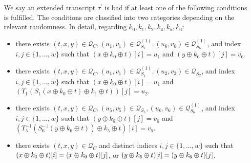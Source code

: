 \begin{definition}
	\label{defn:bad-tau-6-rounds}
	
	We say an extended transcript $\tau^{\prime}$ is bad if at least one of the following conditions is fulfilled. The conditions are classified into two categories depending on the relevant randomness. In detail, regarding $k_0,k_1,k_2,k_4,k_5,k_6$:
	\begin{itemize}[leftmargin=10mm]
		\item[\cone] there exists $(t, x, y) \in \mathcal{Q}_{C}, \left(u_{1}, v_{1}\right) \in \mathcal{Q}_{S_{1}}^{(1)}, \left(u_{6}, v_{6}\right) \in \mathcal{Q}_{S_{6}}^{(1)}$, and index $i, j \in \{1, \ldots, w\}$ such that $\left(x \oplus k_{0} \oplus t\right)[i]=u_1$ and $\left(y \oplus k_{6} \oplus t\right)[j]=v_6$.
		\item[\ctwo] there exists $(t, x, y) \in \mathcal{Q}_{C}, \left(u_{1}, v_{1}\right) \in \mathcal{Q}_{S_{1}}^{(1)}, \left(u_{2}, v_{2}\right) \in \mathcal{Q}_{S_{2}}$, and index $i, j \in \{1, \ldots, w\}$ such that $\left(x \oplus k_{0} \oplus t\right)[i]=u_1$ and $\left(T_{1}\left(S_{1}\left(x \oplus k_{0} \oplus t\right) \oplus k_{1} \oplus t\right)\right)[j]=u_2$.
		\item[\cthree] there exists $(t, x, y) \in \mathcal{Q}_{C}, \left(u_{5}, v_{5}\right) \in \mathcal{Q}_{S_{5}}, \left(u_{6}, v_{6}\right) \in \mathcal{Q}_{S_{6}}^{(1)}$, and index $i, j \in \{1, \ldots, w\}$ such that $\left(y \oplus k_{6} \oplus t\right)[j]=v_6$ and $\left(T_{5}^{-1}\left(S_{6}^{-1}\left(y \oplus k_{6} \oplus t\right)\right) \oplus k_{5} \oplus t\right)[i]=v_5$.
		\item[\cfour] there exists $(t, x, y) \in \mathcal{Q}_{C}$ and distinct indices $i, j \in \{1, \ldots, w\}$ such that $(x\oplus k_0 \oplus t)[i]=(x\oplus k_0 \oplus t)[j]$, or $(y\oplus k_6 \oplus t)[i]=(y\oplus k_6 \oplus t)[j]$.
%		
%		
%		

\end{itemize}
\end{definition}

